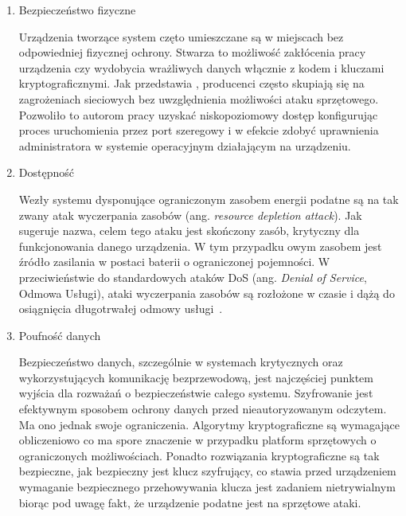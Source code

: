 		\begin{enumerate}[label=\Alph*.]
			\item Bezpieczeństwo fizyczne

				Urządzenia tworzące system częto umieszczane są w miejscach bez odpowiedniej fizycznej ochrony. Stwarza to możliwość zakłócenia pracy urządzenia czy wydobycia wrażliwych danych włącznie z kodem i kluczami kryptograficznymi. Jak przedstawia \cite{iot-hardware-attack}, producenci często skupiają się na zagrożeniach sieciowych bez uwzględnienia możliwości ataku sprzętowego. Pozwoliło to autorom pracy uzyskać niskopoziomowy dostęp konfigurując proces uruchomienia przez port szeregowy i w efekcie zdobyć uprawnienia administratora w systemie operacyjnym działającym na urządzeniu.

			\item Dostępność

				Wezły systemu dysponujące ograniczonym zasobem energii podatne są na tak zwany atak wyczerpania zasobów (ang. \textit{resource depletion attack}). Jak sugeruje nazwa, celem tego ataku jest skończony zasób, krytyczny dla funkcjonowania danego urządzenia. W tym przypadku owym zasobem jest źródło zasilania w postaci baterii o ograniczonej pojemności. W przeciwieństwie do standardowych ataków DoS (ang. \textit{Denial of Service}, Odmowa Usługi), ataki wyczerpania zasobów są rozłożone w czasie i dążą do osiągnięcia długotrwałej odmowy usługi~\cite{iot-rd-attack}.

			\item Poufność danych

				Bezpieczeństwo danych, szczególnie w systemach krytycznych oraz wykorzystujących komunikację bezprzewodową, jest najczęściej punktem wyjścia dla rozważań o bezpieczeństwie całego systemu. Szyfrowanie jest efektywnym sposobem ochrony danych przed nieautoryzowanym odczytem. Ma ono jednak swoje ograniczenia. Algorytmy kryptograficzne są wymagające obliczeniowo co ma spore znaczenie w przypadku platform sprzętowych o ograniczonych możliwościach. Ponadto rozwiązania kryptograficzne są tak bezpieczne, jak bezpieczny jest klucz szyfrujący, co stawia przed urządzeniem wymaganie bezpiecznego przehowywania klucza jest zadaniem nietrywialnym biorąc pod uwagę fakt, że urządzenie podatne jest na sprzętowe ataki.

		\end{enumerate}




